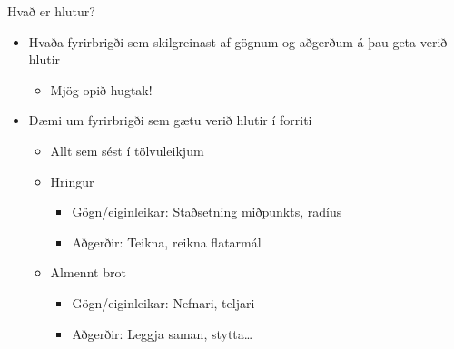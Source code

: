 \documentclass{beamer}
\begin{document}
\begin{frame}{Hvað er hlutur?}
\pause
\begin{itemize}
 \item Hvaða fyrirbrigði sem skilgreinast af gögnum og aðgerðum á þau geta verið hlutir
 \begin{itemize}
  \item Mjög opið hugtak! \pause
 \end{itemize}
 \item Dæmi um fyrirbrigði sem gætu verið hlutir í forriti \pause
 \begin{itemize}
  \item Allt sem sést í tölvuleikjum \pause
  \item Hringur
  \begin{itemize}
   \item Gögn/eiginleikar: Staðsetning miðpunkts, radíus
   \item Aðgerðir: Teikna, reikna flatarmál
  \end{itemize} \pause
  \item Almennt brot
  \begin{itemize}
   \item Gögn/eiginleikar: Nefnari, teljari
   \item Aðgerðir: Leggja saman, stytta\ldots
  \end{itemize}
 \end{itemize}
\end{itemize}
\end{frame}
\end{document}
